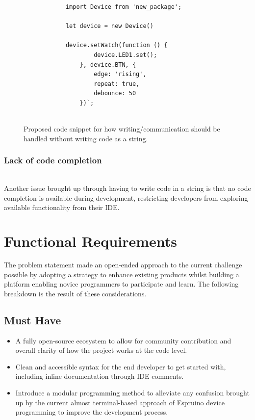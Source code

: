 \documentclass{l4proj}
\begin{document}
     \begin{figure}[H]
     \centering
    \begin{minipage}{8cm}
        \begin{lstlisting}
            import Device from 'new_package';

            let device = new Device()
        
            device.setWatch(function () {
                    device.LED1.set();
                }, device.BTN, {
                    edge: 'rising',
                    repeat: true,
                    debounce: 50
                })`;
            
        \end{lstlisting}
        \end{minipage}
        \caption{Proposed code snippet for how writing/communication should be handled without writing code as a string.}
        \label{fig:NEW_DEVICE_WRITING_CODE}
    \end{figure}

\subsubsection{Lack of code completion}\hfill\\
Another issue brought up through having to write code in a string is that no code completion is available during development, restricting developers from exploring available functionality from their IDE.


\section{Functional Requirements}
The problem statement made an open-ended approach to the current challenge possible by adopting a strategy to enhance existing products whilst building a platform enabling novice programmers to participate and learn. The following breakdown is the result of these considerations.

\subsection{Must Have}
\begin{itemize}
    \item A fully open-source ecosystem to allow for community contribution and overall clarity of how the project works at the code level.
    \item Clean and accessible syntax for the end developer to get started with, including inline documentation through IDE comments.
    \item Introduce a modular programming method to alleviate any confusion brought up by the current almost terminal-based approach of Espruino device programming to improve the development process.
\end{itemize}
\end{document}
